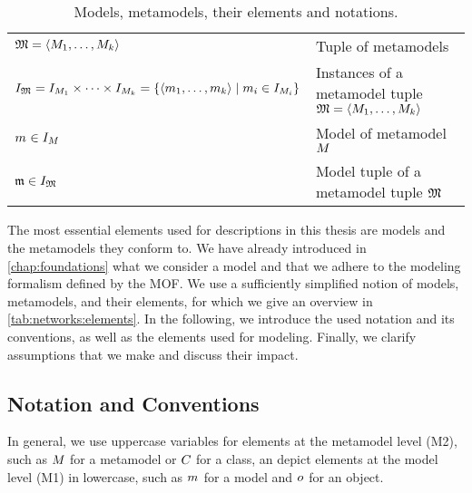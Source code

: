 \begin{table}
\begin{tabular}{R{4.8cm} L{5cm}}
        $\metamodeltuple{M} = \tupled{\metamodel{M}{1}, \dots, \metamodel{M}{k}}$
            & Tuple of metamodels\\
        $\metamodeltupleinstanceset{M} = \metamodelinstanceset{M}{1} \times \dots \times \metamodelinstanceset{M}{k} = \setted{ \tupled{\model{m}{1}, \dots, \model{m}{k}} \mid \model{m}{i} \in \metamodelinstanceset{M}{i}}$
            & Instances of a metamodel tuple $\metamodeltuple{M} = \tupled{\metamodel{M}{1}, \dots, \metamodel{M}{k}}$\\
        $\model{m}{} \in \metamodelinstanceset{M}{}$
            & Model of metamodel $\metamodel{M}{}$\\
        $\modeltuple{m} \in \metamodeltupleinstanceset{M}$
            & Model tuple of a metamodel tuple $\metamodeltuple{M}$\\
        \bottomrule
    \end{tabular}
    \caption[Models, metamodels, their elements and notations]{Models, metamodels, their elements and notations.}
    \label{tab:networks:elements}
\end{table}

The most essential elements used for descriptions in this thesis are models and the metamodels they conform to.
We have already introduced in \autoref{chap:foundations} what we consider a model and that we adhere to the modeling formalism defined by the \gls{MOF}.
We use a sufficiently simplified notion of models, metamodels, and their elements, for which we give an overview in \autoref{tab:networks:elements}.
In the following, we introduce the used notation and its conventions, as well as the elements used for modeling.
Finally, we clarify assumptions that we make and discuss their impact.


\subsection{Notation and Conventions}

In general, we use uppercase variables for elements at the metamodel level (M2), such as $\metamodel{M}{}$ for a metamodel or $\class{C}{}$ for a class, an depict elements at the model level (M1) in lowercase, such as $\model{m}{}$ for a model and $\object{o}{}$ for an object.

